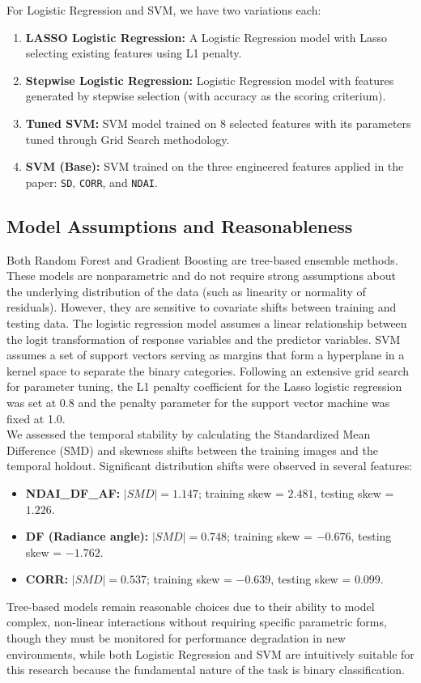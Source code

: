 For Logistic Regression and SVM, we have two variations each:
\begin{enumerate}
    \item \textbf{LASSO Logistic Regression:} A Logistic Regression model with Lasso selecting existing features using L1 penalty.
    \item \textbf{Stepwise Logistic Regression:} Logistic Regression model with features generated by stepwise selection (with accuracy as the scoring criterium).
    \item \textbf{Tuned SVM:} SVM model trained on 8 selected features with its parameters tuned through Grid Search methodology.
    \item \textbf{SVM (Base):} SVM trained on the three engineered features applied in the paper: \texttt{SD}, \texttt{CORR}, and \texttt{NDAI}.
\end{enumerate}

\subsection{Model Assumptions and Reasonableness}
Both Random Forest and Gradient Boosting are tree-based ensemble methods. These models are nonparametric and do not require strong assumptions about the underlying distribution of the data (such as linearity or normality of residuals). However, they are sensitive to covariate shifts between training and testing data.
The logistic regression model assumes a linear relationship between the logit transformation of response variables and the predictor variables. SVM assumes a set of support vectors serving as margins that form a hyperplane in a kernel space to separate the binary categories. Following an extensive grid search for parameter tuning, the L1 penalty coefficient for the Lasso logistic regression was set at 0.8 and the penalty parameter for the support vector machine was fixed at 1.0. \\


We assessed the temporal stability by calculating the Standardized Mean Difference (SMD) and skewness shifts between the training images and the temporal holdout. Significant distribution shifts were observed in several features:
\begin{itemize}
    \item \textbf{NDAI\_DF\_AF:} $|SMD| = 1.147$; training skew = $2.481$, testing skew = $1.226$.
    \item \textbf{DF (Radiance angle):} $|SMD| = 0.748$; training skew = $-0.676$, testing skew = $-1.762$.
    \item \textbf{CORR:} $|SMD| = 0.537$; training skew = $-0.639$, testing skew = $0.099$.
\end{itemize}
Tree-based models remain reasonable choices due to their ability to model complex, non-linear interactions without requiring specific parametric forms, though they must be monitored for performance degradation in new environments, while both Logistic Regression and SVM are intuitively suitable for this research because the fundamental nature of the task is binary classification. 


